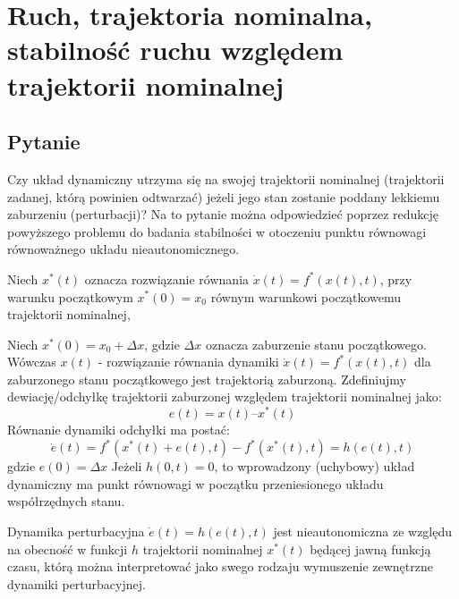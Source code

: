\documentclass{article}
\begin{document}
	\section{Ruch, trajektoria nominalna, stabilność ruchu względem trajektorii nominalnej}
		\subsection{Pytanie}
			Czy układ dynamiczny utrzyma się na swojej trajektorii nominalnej (trajektorii zadanej, którą
			powinien odtwarzać) jeżeli jego stan zostanie poddany lekkiemu zaburzeniu (perturbacji)?
			Na to pytanie można odpowiedzieć poprzez redukcję powyższego problemu do badania
			stabilności w otoczeniu punktu równowagi równoważnego układu nieautonomicznego.

			Niech $x^*(t)$ oznacza rozwiązanie równania $\dot{x}(t) = f^*(x(t),t)$, przy warunku
			początkowym $x^*(0) = x_0$ równym warunkowi początkowemu trajektorii nominalnej,

			Niech $x^*(0) = x_0 + \Delta x$, gdzie $\Delta x$ oznacza zaburzenie stanu początkowego.
			Wówczas $x(t)$ - rozwiązanie równania dynamiki $ \dot{x}(t) = f^*(x(t),t)$ dla zaburzonego
			stanu początkowego jest trajektorią zaburzoną. Zdefiniujmy dewiację/odchyłkę
			trajektorii zaburzonej względem trajektorii nominalnej jako:
			\begin{equation}
				e(t) = x(t) – x^*(t)
			\end{equation}
			Równanie dynamiki odchyłki ma postać:
			\begin{equation}
				\dot{e}(t) = f^*(x^*(t)+e(t),t) - f^*(x^*(t),t) = h(e(t),t)
			\end{equation}
			gdzie $e(0) = \Delta x$
			Jeżeli $h(0,t) = 0$, to wprowadzony (uchybowy) układ dynamiczny ma punkt równowagi
			w początku przeniesionego układu współrzędnych stanu.

			Dynamika perturbacyjna $\dot{e}(t) = h(e(t),t)$ jest nieautonomiczna ze względu na obecność
			w funkcji $h$ trajektorii nominalnej $x^*(t)$ będącej jawną funkcją czasu, którą można
			interpretować jako swego rodzaju wymuszenie zewnętrzne dynamiki perturbacyjnej.
\end{document}
